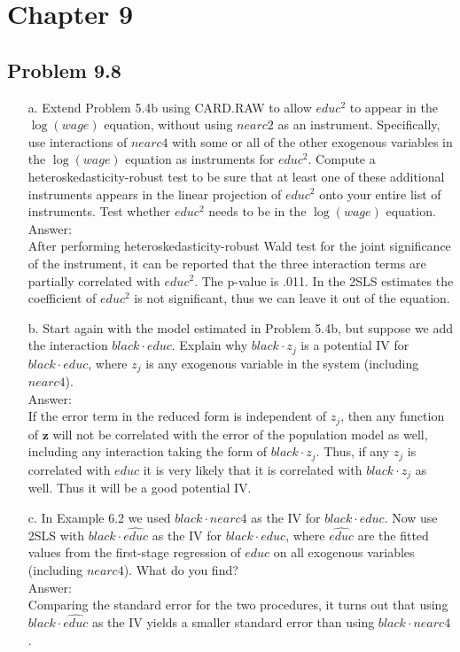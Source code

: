 \documentclass[10pt]{article}
\begin{document}
\section*{Chapter 9}
\subsection*{Problem 9.8}
\begin{enumerate}
\item[a.] Extend Problem 5.4b using CARD.RAW to allow $educ^2$ to appear in the $\log(wage)$ equation, without using $nearc2$ as an instrument. Specifically, use interactions of $nearc4$ with some or all of the other exogenous variables in the $\log(wage)$ equation as instruments for $educ^2$. Compute a heteroskedasticity-robust test to be sure that at least one of these additional instruments appears in the linear projection of $educ^2$ onto your entire list of instruments. Test whether $educ^2$ needs to be in the $\log(wage)$ equation. 
\\ Answer:\\

After performing heteroskedasticity-robust Wald test for the joint significance of the instrument, it can be reported that the three interaction terms are partially correlated with $educ^2$. The p-value is .011. In the 2SLS estimates the coefficient of $educ^2$ is not significant, thus we can leave it out of the equation.

\item[b.] Start again with the model estimated in Problem 5.4b, but suppose we add the interaction $black\cdot educ$. Explain why $black\cdot z_j$ is a potential IV for $black\cdot educ$, where $z_j$ is any exogenous variable in the system (including $nearc4$). 
\\ Answer:\\

If the error term in the reduced form is independent of $z_j$, then any function of $\textbf{z}$ will not be correlated with the error of the population model as well, including any interaction taking the form of $black\cdot z_j$. Thus, if any $z_j$ is correlated with $educ$ it is very likely that it is correlated with $black\cdot z_j$ as well. Thus it will be a good potential IV.

\item[c.] In Example 6.2 we used $black\cdot nearc4$ as the IV for $black\cdot educ$. Now use 2SLS with $black\cdot\hat{educ}$ as the IV for $black\cdot educ$, where $\hat{educ}$ are the fitted values from the first-stage regression of $educ$ on all exogenous variables (including $nearc4$). What do you find? 
\\ Answer:\\

Comparing the standard error for the two procedures, it turns out that using $black\cdot\hat{educ}$ as the IV yields a smaller standard error than using $black\cdot nearc4$.


\end{enumerate}
\end{document}
